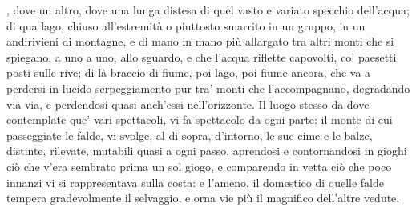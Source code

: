 \documentclass[b5paper]{memoir}
\begin{document}
%
, dove un altro, dove una lunga distesa di quel vasto e variato specchio dell’acqua; di qua lago, chiuso all’estremità o piuttosto smarrito in un gruppo, in un andirivieni di montagne, e di mano in mano più allargato tra altri monti che si spiegano, a uno a uno, allo sguardo, e che
l’acqua riflette capovolti, co’ paesetti posti sulle rive; di là braccio di fiume, poi lago, poi fiume ancora, che va a perdersi in lucido serpeggiamento pur tra’ monti che l’accompagnano, degradando via via, e perdendosi quasi anch’essi nell’orizzonte. Il luogo stesso da dove contemplate que’ vari spettacoli, vi fa spettacolo da ogni parte: il monte di cui passeggiate le falde, vi svolge, al di sopra, d’intorno, le sue cime e le balze, distinte, rilevate, mutabili quasi a ogni passo, aprendosi e contornandosi in gioghi ciò che v’era sembrato prima un sol giogo, e comparendo in vetta ciò che poco innanzi vi si rappresentava sulla costa: e l’ameno, il domestico di quelle falde tempera gradevolmente il selvaggio, e orna vie più il magnifico dell’altre vedute.
\pend
\numberpstartfalse
\endnumbering
\end{document}
